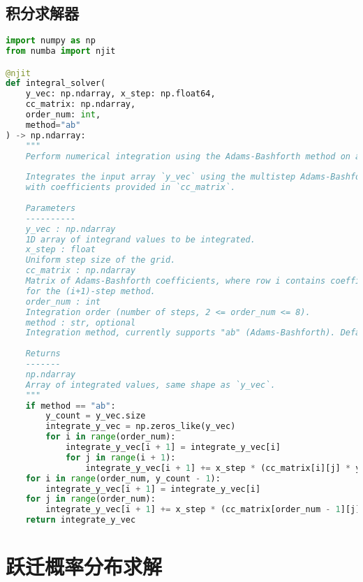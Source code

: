 \section{积分求解器}\label{app:integral_solver}
\begin{lstlisting}[language=Python, caption={积分求解器}, label={code:integral_solver}]
import numpy as np
from numba import njit

@njit
def integral_solver(
	y_vec: np.ndarray, x_step: np.float64,
	cc_matrix: np.ndarray,
	order_num: int,
	method="ab"
) -> np.ndarray:
    """
	Perform numerical integration using the Adams-Bashforth method on a uniform grid.
	
	Integrates the input array `y_vec` using the multistep Adams-Bashforth method
	with coefficients provided in `cc_matrix`.
	
	Parameters
	----------
	y_vec : np.ndarray
	1D array of integrand values to be integrated.
	x_step : float
	Uniform step size of the grid.
	cc_matrix : np.ndarray
	Matrix of Adams-Bashforth coefficients, where row i contains coefficients
	for the (i+1)-step method.
	order_num : int
	Integration order (number of steps, 2 <= order_num <= 8).
	method : str, optional
	Integration method, currently supports "ab" (Adams-Bashforth). Default is "ab".
	
	Returns
	-------
	np.ndarray
	Array of integrated values, same shape as `y_vec`.
	"""
	if method == "ab":
		y_count = y_vec.size
		integrate_y_vec = np.zeros_like(y_vec)
		for i in range(order_num):
			integrate_y_vec[i + 1] = integrate_y_vec[i]
			for j in range(i + 1):
				integrate_y_vec[i + 1] += x_step * (cc_matrix[i][j] * y_vec[i - j])
	for i in range(order_num, y_count - 1):
		integrate_y_vec[i + 1] = integrate_y_vec[i]
	for j in range(order_num):
		integrate_y_vec[i + 1] += x_step * (cc_matrix[order_num - 1][j] * y_vec[i - j])
	return integrate_y_vec
\end{lstlisting}

\chapter{跃迁概率分布求解}
